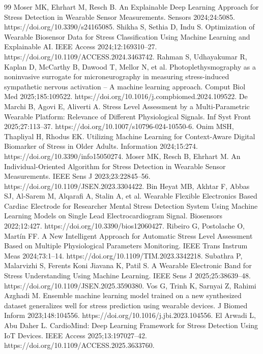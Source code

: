 \documentclass[11pt,a4paper]{article}
\begin{document}
\begin{thebibliography}{99}
 Moser MK, Ehrhart M, Resch B. An Explainable Deep Learning Approach for Stress Detection in Wearable Sensor Measurements. Sensors 2024;24:5085. https://doi.org/10.3390/s24165085.
 Shikha S, Sethia D, Indu S. Optimization of Wearable Biosensor Data for Stress Classification Using Machine Learning and Explainable AI. IEEE Access 2024;12:169310--27. https://doi.org/10.1109/ACCESS.2024.3463742.
 Rahman S, Udhayakumar R, Kaplan D, McCarthy B, Dawood T, Mellor N, et al. Photoplethysmography as a noninvasive surrogate for microneurography in measuring stress-induced sympathetic nervous activation -- A machine learning approach. Comput Biol Med 2025;185:109522. https://doi.org/10.1016/j.compbiomed.2024.109522.
 De Marchi B, Agovi E, Aliverti A. Stress Level Assessment by a Multi-Parametric Wearable Platform: Relevance of Different Physiological Signals. Inf Syst Front 2025;27:113--37. https://doi.org/10.1007/s10796-024-10550-6.
 Onim MSH, Thapliyal H, Rhodus EK. Utilizing Machine Learning for Context-Aware Digital Biomarker of Stress in Older Adults. Information 2024;15:274. https://doi.org/10.3390/info15050274.
 Moser MK, Resch B, Ehrhart M. An Individual-Oriented Algorithm for Stress Detection in Wearable Sensor Measurements. IEEE Sens J 2023;23:22845--56. https://doi.org/10.1109/JSEN.2023.3304422.
 Bin Heyat MB, Akhtar F, Abbas SJ, Al-Sarem M, Alqarafi A, Stalin A, et al. Wearable Flexible Electronics Based Cardiac Electrode for Researcher Mental Stress Detection System Using Machine Learning Models on Single Lead Electrocardiogram Signal. Biosensors 2022;12:427. https://doi.org/10.3390/bios12060427.
 Ribeiro G, Postolache O, Martín FF. A New Intelligent Approach for Automatic Stress Level Assessment Based on Multiple Physiological Parameters Monitoring. IEEE Trans Instrum Meas 2024;73:1--14. https://doi.org/10.1109/TIM.2023.3342218.
 Subathra P, Malarvizhi S, Ferents Koni Jiavana K, Patil S. A Wearable Electronic Band for Stress Understanding Using Machine Learning. IEEE Sens J 2025;25:38639--48. https://doi.org/10.1109/JSEN.2025.3590380.
 Vos G, Trinh K, Sarnyai Z, Rahimi Azghadi M. Ensemble machine learning model trained on a new synthesized dataset generalizes well for stress prediction using wearable devices. J Biomed Inform 2023;148:104556. https://doi.org/10.1016/j.jbi.2023.104556.
 El Arwadi L, Abu Daher L. CardioMind: Deep Learning Framework for Stress Detection Using IoT Devices. IEEE Access 2025;13:197027--42. https://doi.org/10.1109/ACCESS.2025.3633760.

\end{thebibliography}
\end{document}
